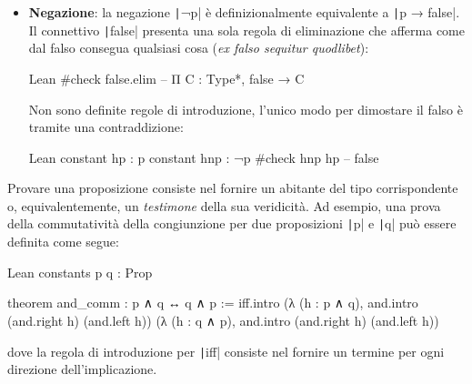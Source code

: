 \begin{itemize}
\begin{code}{Lean}
-- Equivalentemente
#check p ∨ q -- Prop
        \end{code}
        dove \texttt|or| è definito come un tipo induttivo con due costruttori. Un termine di tipo $p \vee q$ può essere costruito, equivalentemente, tramite un termine di tipo $p$ o un termine di tipo $q$:
        \begin{code}{Lean}
inductive or : Prop → Prop → Prop
| inl : ∀ {p q : Prop}, p → or p q
| inr : ∀ {p q : Prop}, q → or p q
        \end{code}
        L'unica regola di eliminazione per \texttt|or| afferma che sia possibile provare una proposizione $r$ qualsiasi a partire da $p \vee q$, mostrando che sia $p$ che $q$ implicano $r$: 
        \begin{code}{Lean}
#check or.elim -- or.elim : ∀ {p q r : Prop}, p $\vee$ q → (p → r) → (q → r) → r
        \end{code}
        
        \texttt|or| può essere considerata una specializzazione del tipo coprodotto \texttt|sum| ($\oplus$) per le proposizioni.
    
    \item
        \textbf{Negazione}: la negazione \texttt|¬p| è definizionalmente equivalente a \texttt|p → false|. Il connettivo  \texttt|false| presenta una sola regola di eliminazione che afferma come dal falso consegua qualsiasi cosa (\emph{ex falso sequitur quodlibet}):
        \begin{code}{Lean}
#check false.elim -- Π {C : Type*}, false → C
        \end{code}
        Non sono definite regole di introduzione, l'unico modo per dimostare il falso è tramite una contraddizione:
        \begin{code}{Lean}
constant hp : p
constant hnp : ¬p
#check hnp hp -- false
        \end{code}
    \end{itemize}

Provare una proposizione consiste nel fornire un abitante del tipo corrispondente o, equivalentemente, un \emph{testimone} della sua veridicità.
Ad esempio, una prova della commutatività della congiunzione per due proposizioni \texttt|p| e \texttt|q| può essere definita come segue:
\begin{code}{Lean}
constants p q : Prop

theorem and_comm : p ∧ q ↔ q ∧ p :=
  iff.intro
    (λ (h : p ∧ q), and.intro (and.right h) (and.left h))
    (λ (h : q ∧ p), and.intro (and.right h) (and.left h))
\end{code}
dove la regola di introduzione per \texttt|iff| consiste nel fornire un termine per ogni direzione dell'implicazione.

